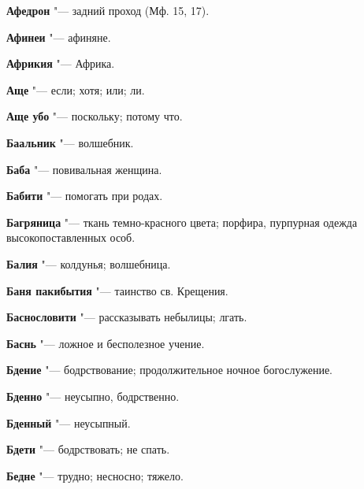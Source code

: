 \begin{mymulticols}{2}
\noindent\textbf{Афедрон} "--- задний проход (Мф. 15, 17). 




\noindent\textbf{Афинеи} "--- афиняне. 




\noindent\textbf{Африкия} "--- Африка. 




\noindent\textbf{Аще} "--- если; хотя; или; ли. 




\noindent\textbf{Аще убо} "--- поскольку; потому что. 




\bukvaending






\noindent\textbf{Баальник} "--- волшебник. 




\noindent\textbf{Баба} "--- повивальная женщина. 




\noindent\textbf{Бабити} "--- помогать при родах. 




\noindent\textbf{Багряница} "--- ткань темно-красного цвета; порфира, пурпурная одежда высокопоставленных особ. 




\noindent\textbf{Балия} "--- колдунья; волшебница. 




\noindent\textbf{Баня пакибытия} "--- таинство св. Крещения. 




\noindent\textbf{Баснословити} "--- рассказывать небылицы; лгать. 




\noindent\textbf{Баснь} "--- ложное и бесполезное учение. 




\noindent\textbf{Бдение} "--- бодрствование; продолжительное ночное богослужение. 




\noindent\textbf{Бденно} "--- неусыпно, бодрственно. 




\noindent\textbf{Бденный} "--- неусыпный. 




\noindent\textbf{Бдети} "--- бодрствовать; не спать. 




\noindent\textbf{Бедне} "--- трудно; несносно; тяжело. 





\end{mymulticols}

